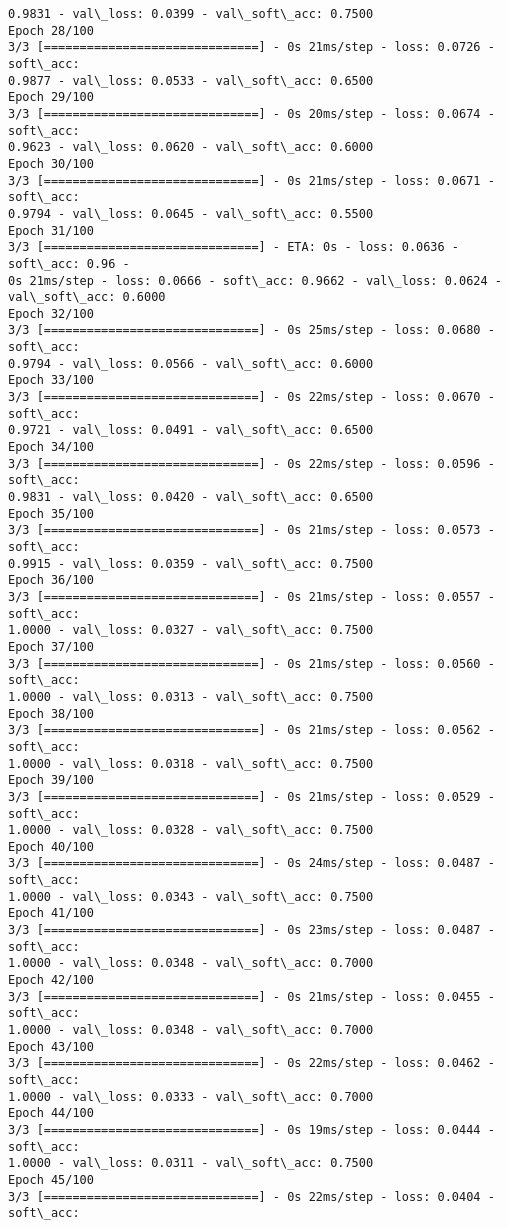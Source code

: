 \documentclass[11pt]{article}
\begin{document}
\begin{Verbatim}[commandchars=\\\{\}]
0.9831 - val\_loss: 0.0399 - val\_soft\_acc: 0.7500
Epoch 28/100
3/3 [==============================] - 0s 21ms/step - loss: 0.0726 - soft\_acc:
0.9877 - val\_loss: 0.0533 - val\_soft\_acc: 0.6500
Epoch 29/100
3/3 [==============================] - 0s 20ms/step - loss: 0.0674 - soft\_acc:
0.9623 - val\_loss: 0.0620 - val\_soft\_acc: 0.6000
Epoch 30/100
3/3 [==============================] - 0s 21ms/step - loss: 0.0671 - soft\_acc:
0.9794 - val\_loss: 0.0645 - val\_soft\_acc: 0.5500
Epoch 31/100
3/3 [==============================] - ETA: 0s - loss: 0.0636 - soft\_acc: 0.96 -
0s 21ms/step - loss: 0.0666 - soft\_acc: 0.9662 - val\_loss: 0.0624 -
val\_soft\_acc: 0.6000
Epoch 32/100
3/3 [==============================] - 0s 25ms/step - loss: 0.0680 - soft\_acc:
0.9794 - val\_loss: 0.0566 - val\_soft\_acc: 0.6000
Epoch 33/100
3/3 [==============================] - 0s 22ms/step - loss: 0.0670 - soft\_acc:
0.9721 - val\_loss: 0.0491 - val\_soft\_acc: 0.6500
Epoch 34/100
3/3 [==============================] - 0s 22ms/step - loss: 0.0596 - soft\_acc:
0.9831 - val\_loss: 0.0420 - val\_soft\_acc: 0.6500
Epoch 35/100
3/3 [==============================] - 0s 21ms/step - loss: 0.0573 - soft\_acc:
0.9915 - val\_loss: 0.0359 - val\_soft\_acc: 0.7500
Epoch 36/100
3/3 [==============================] - 0s 21ms/step - loss: 0.0557 - soft\_acc:
1.0000 - val\_loss: 0.0327 - val\_soft\_acc: 0.7500
Epoch 37/100
3/3 [==============================] - 0s 21ms/step - loss: 0.0560 - soft\_acc:
1.0000 - val\_loss: 0.0313 - val\_soft\_acc: 0.7500
Epoch 38/100
3/3 [==============================] - 0s 21ms/step - loss: 0.0562 - soft\_acc:
1.0000 - val\_loss: 0.0318 - val\_soft\_acc: 0.7500
Epoch 39/100
3/3 [==============================] - 0s 21ms/step - loss: 0.0529 - soft\_acc:
1.0000 - val\_loss: 0.0328 - val\_soft\_acc: 0.7500
Epoch 40/100
3/3 [==============================] - 0s 24ms/step - loss: 0.0487 - soft\_acc:
1.0000 - val\_loss: 0.0343 - val\_soft\_acc: 0.7500
Epoch 41/100
3/3 [==============================] - 0s 23ms/step - loss: 0.0487 - soft\_acc:
1.0000 - val\_loss: 0.0348 - val\_soft\_acc: 0.7000
Epoch 42/100
3/3 [==============================] - 0s 21ms/step - loss: 0.0455 - soft\_acc:
1.0000 - val\_loss: 0.0348 - val\_soft\_acc: 0.7000
Epoch 43/100
3/3 [==============================] - 0s 22ms/step - loss: 0.0462 - soft\_acc:
1.0000 - val\_loss: 0.0333 - val\_soft\_acc: 0.7000
Epoch 44/100
3/3 [==============================] - 0s 19ms/step - loss: 0.0444 - soft\_acc:
1.0000 - val\_loss: 0.0311 - val\_soft\_acc: 0.7500
Epoch 45/100
3/3 [==============================] - 0s 22ms/step - loss: 0.0404 - soft\_acc:

\end{Verbatim}
\end{document}
